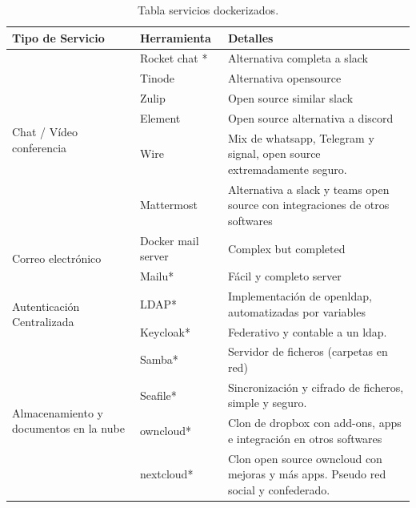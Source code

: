 \begin{center}
\begin{longtable}[!ht]{|p{3cm}|p{4cm}|p{6cm}|}
\caption{Tabla servicios dockerizados.}  
\label{T:servicios_dockerizados}
\\ \hline
\textbf{Tipo de Servicio} & \textbf{Herramienta} & \textbf{Detalles} \\ \hline

\multirow{6}{4em}{ Chat / Vídeo conferencia} & Rocket chat\cite{c_rocket_chat} * & Alternativa completa a slack \\ \cline{2-3} 
 & Tinode \cite{c_tinode} & Alternativa opensource \\ \cline{2-3} 
 & Zulip \cite{c_zulip} & Open source similar slack \\ \cline{2-3} 
 & Element \cite{c_element} & Open source alternativa a discord \\ \cline{2-3} 
 & Wire \cite{c_wire} & Mix de whatsapp, Telegram y signal, open source extremadamente seguro. \\ \cline{2-3} 
 & Mattermost \cite{c_mattermost} & Alternativa a slack y teams open source con integraciones de otros softwares \\ \hline

\multirow{2}{4em}{Correo electrónico} & Docker mail server\cite{c_docker_mail} & Complex but completed \\ \cline{2-3} 
 & Mailu\cite{c_mailu}* & Fácil y completo server \\ \hline
 
\multirow{2}{4em}{Autenticación Centralizada} & LDAP\cite{c_ldap}* &  Implementación de openldap, automatizadas por variables \\ \cline{2-3} 
 & Keycloak\cite{c_keycloak}* &  Federativo y contable a un ldap. \\ \hline
 
\multirow{4}{4em}{Almacenamiento y documentos en la nube} & Samba\cite{c_samba}* & Servidor de ficheros (carpetas en red) \\ \cline{2-3} 
 & Seafile\cite{c_seafile}* & Sincronización y cifrado de ficheros, simple y seguro. \\ \cline{2-3} 
 & owncloud\cite{c_owncloud}* & Clon de dropbox con add-ons, apps e integración en otros softwares \\ \cline{2-3} 
 & nextcloud\cite{c_nextcloud}* & Clon open source owncloud con mejoras y más apps. Pseudo red social y confederado. \\ \hline
 

\end{longtable}
\end{center}

